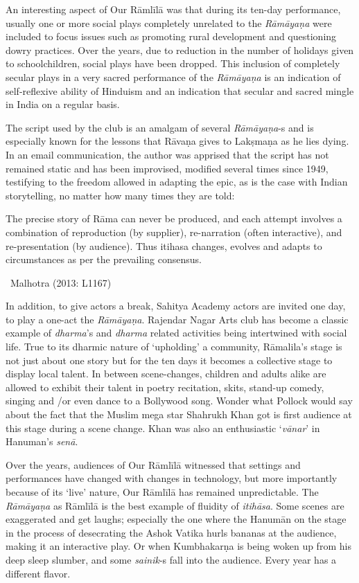 An interesting aspect of Our Rāmlīlā was that during its ten-day performance, usually one or more social plays completely unrelated to the \textit{Rāmāyaṇa} were included to focus issues such as promoting rural development and questioning dowry practices. Over the years, due to reduction in the number of holidays given to schoolchildren, social plays have been dropped. This inclusion of completely secular plays in a very sacred performance of the \textit{Rāmāyaṇa} is an indication of self-reflexive ability of Hinduism and an indication that secular and sacred mingle in India on a regular basis.

The script used by the club is an amalgam of several \textit{Rāmāyaṇa}-s and is especially known for the lessons that Rāvaṇa gives to Lakṣmaṇa as he lies dying. In an email communication, the author was apprised that the script has not remained static and has been improvised, modified several times since 1949, testifying to the freedom allowed in adapting the epic, as is the case with Indian storytelling, no matter how many times they are told:

\begin{myquote}
The precise story of Rāma can never be produced, and each attempt involves a combination of reproduction (by supplier), re-narration (often interactive), and re-presentation (by audience). Thus itihasa changes, evolves and adapts to circumstances as per the prevailing consensus.

~\hfill Malhotra (2013: L1167)
\end{myquote}

In addition, to give actors a break, Sahitya Academy actors are invited one day, to play a one-act the \textit{Rāmāyaṇa}. Rajendar Nagar Arts club has become a classic example of \textit{dharma}’s and \textit{dharma} related activities being intertwined with social life. True to its dharmic nature of ‘upholding’ a community, Rāmalila’s stage is not just about one story but for the ten days it becomes a collective stage to display local talent. In between scene-changes, children and adults alike are allowed to exhibit their talent in poetry recitation, skits, stand-up comedy, singing and /or even dance to a Bollywood song. Wonder what Pollock would say about the fact that the Muslim mega star Shahrukh Khan got is first audience at this stage during a scene change. Khan was also an enthusiastic ‘\textit{vānar}’ in Hanuman’s \textit{senā}.

\newpage

Over the years, audiences of Our Rāmlīlā witnessed that settings and performances have changed with changes in technology, but more importantly because of its ‘live’ nature, Our Rāmlīlā has remained unpredictable. The \textit{Rāmāyaṇa} as Rāmlīlā is the best example of fluidity of \textit{itihāsa}. Some scenes are exaggerated and get laughs; especially the one where the Hanumān on the stage in the process of desecrating the Ashok Vatika hurls bananas at the audience, making it an interactive play. Or when Kumbhakarṇa is being woken up from his deep sleep slumber, and some \textit{sainik}-s fall into the audience. Every year has a different flavor.


